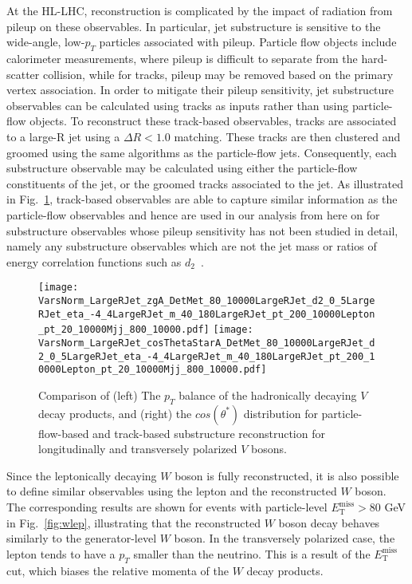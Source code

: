\documentclass[amsmath,amssymb,aps,prd,preprint,groupedaddress]{revtex4-2}
\begin{document}
At the HL-LHC, reconstruction is complicated by the impact of radiation from pileup on these observables.
In particular, jet substructure is sensitive to the wide-angle, low-$p_T$ particles associated with pileup.
Particle flow objects include calorimeter measurements, where pileup is difficult to separate from the hard-scatter collision, while for tracks, pileup may be removed based on the primary vertex association. In order to mitigate their pileup sensitivity, jet substructure observables can be calculated using tracks as inputs rather than using particle-flow objects. 
To reconstruct these track-based observables, tracks are associated to a large-R jet using a $\Delta R < 1.0$ matching. These tracks are then clustered and groomed using the same algorithms as the particle-flow jets. Consequently, each substructure observable may be calculated using either the particle-flow constituents of the jet, or the groomed tracks associated to the jet.
As illustrated in Fig.~\ref{fig:trackVall}, track-based observables are able to capture similar information as the particle-flow observables and hence are used in our analysis from here on for substructure observables whose pileup sensitivity has not been studied in detail, namely any substructure observables which are not the jet mass or ratios of energy correlation functions such as $d_2$~\cite{Larkoski:2015kga}.

\begin{figure}[thb]
  \centering
  \texttt{[image: VarsNorm\_LargeRJet\_zgA\_DetMet\_80\_10000LargeRJet\_d2\_0\_5LargeRJet\_eta\_-4\_4LargeRJet\_m\_40\_180LargeRJet\_pt\_200\_10000Lepton\_pt\_20\_10000Mjj\_800\_10000.pdf]} 
  \texttt{[image: VarsNorm\_LargeRJet\_cosThetaStarA\_DetMet\_80\_10000LargeRJet\_d2\_0\_5LargeRJet\_eta\_-4\_4LargeRJet\_m\_40\_180LargeRJet\_pt\_200\_10000Lepton\_pt\_20\_10000Mjj\_800\_10000.pdf]} 
  \caption{Comparison of (left) The $p_T$ balance of the hadronically decaying $V$ decay products, and (right) the $cos(\theta^{*})$ distribution for particle-flow-based and track-based substructure reconstruction for longitudinally and transversely polarized $V$ bosons.}
  \label{fig:trackVall}
\end{figure}



Since the leptonically decaying $W$ boson is fully reconstructed, it is also possible to define similar observables using the lepton and the reconstructed $W$ boson. 
The corresponding results are shown for events with particle-level $E_{\text{T}}^{\text{miss}}>80$ GeV in Fig.~\ref{fig:wlep}, illustrating that the reconstructed $W$ boson decay behaves similarly to the generator-level $W$ boson. 
In the transversely polarized case, the lepton tends to have a $p_{T}$ smaller than the neutrino. This is a result of the $E_{\text{T}}^{\text{miss}}$ cut, 
which biases the relative momenta of the $W$ decay products. 
\end{document}
